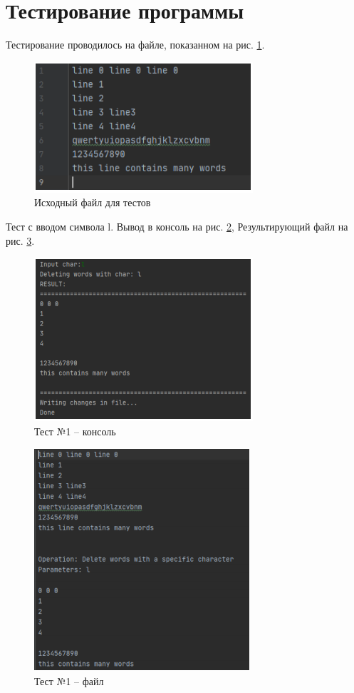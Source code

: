 \documentclass[12pt,a4paper]{article}  %
\begin{document}
	\newpage
	
	\section*{Тестирование программы}
	
	Тестирование проводилось на файле, показанном на рис. \ref{file_example}.
	
	\begin{figure}[h]
		\centering
		\includegraphics[width=0.6\linewidth]{photo/file_example}
		\caption{Исходный файл для тестов}
		\label{file_example}
	\end{figure}
	
	Тест с вводом символа l. Вывод в консоль на рис. \ref{test.1.console}, Результирующий
	файл на рис. \ref{test.1.file}.
	
	\begin{figure}[H]
		\centering
		\includegraphics[width=0.6\linewidth]{photo/test.1.console}
		\caption{Тест №1 -- консоль}
		\label{test.1.console}
	\end{figure}

	\begin{figure}[H]
		\centering
		\includegraphics[width=0.6\linewidth]{photo/test.1.file}
		\caption{Тест №1 -- файл}
		\label{test.1.file}
	\end{figure}
\end{document}
